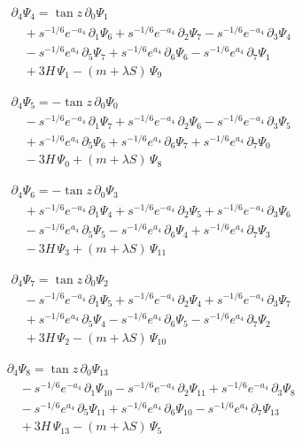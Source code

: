 \documentclass[11pt]{article}
\begin{document}
\[
\begin{aligned}
&\partial_{4}\Psi_{4}=\tan z\,\partial_{0}\Psi_{1} \\
&\quad +s^{-1/6}e^{-a_4}\,\partial_{1}\Psi_{6}+s^{-1/6}e^{-a_4}\,\partial_{2}\Psi_{7}-s^{-1/6}e^{-a_4}\,\partial_{3}\Psi_{4} \\
&\quad -s^{-1/6}e^{a_4}\,\partial_{5}\Psi_{7}+s^{-1/6}e^{a_4}\,\partial_{6}\Psi_{6}-s^{-1/6}e^{a_4}\,\partial_{7}\Psi_{1} \\
&\quad +3H\,\Psi_{1}-(m+\lambda S)\,\Psi_{9}
\end{aligned}\tag{V4}
\]

\[
\begin{aligned}
&\partial_{4}\Psi_{5}=-\tan z\,\partial_{0}\Psi_{0} \\
&\quad -s^{-1/6}e^{-a_4}\,\partial_{1}\Psi_{7}+s^{-1/6}e^{-a_4}\,\partial_{2}\Psi_{6}-s^{-1/6}e^{-a_4}\,\partial_{3}\Psi_{5} \\
&\quad +s^{-1/6}e^{a_4}\,\partial_{5}\Psi_{6}+s^{-1/6}e^{a_4}\,\partial_{6}\Psi_{7}+s^{-1/6}e^{a_4}\,\partial_{7}\Psi_{0} \\
&\quad -3H\,\Psi_{0}+(m+\lambda S)\,\Psi_{8}
\end{aligned}\tag{V5}
\]

\[
\begin{aligned}
&\partial_{4}\Psi_{6}=-\tan z\,\partial_{0}\Psi_{3} \\
&\quad +s^{-1/6}e^{-a_4}\,\partial_{1}\Psi_{4}+s^{-1/6}e^{-a_4}\,\partial_{2}\Psi_{5}+s^{-1/6}e^{-a_4}\,\partial_{3}\Psi_{6} \\
&\quad -s^{-1/6}e^{a_4}\,\partial_{5}\Psi_{5}-s^{-1/6}e^{a_4}\,\partial_{6}\Psi_{4}+s^{-1/6}e^{a_4}\,\partial_{7}\Psi_{3} \\
&\quad -3H\,\Psi_{3}+(m+\lambda S)\,\Psi_{11}
\end{aligned}\tag{V6}
\]

\[
\begin{aligned}
&\partial_{4}\Psi_{7}=\tan z\,\partial_{0}\Psi_{2} \\
&\quad -s^{-1/6}e^{-a_4}\,\partial_{1}\Psi_{5}+s^{-1/6}e^{-a_4}\,\partial_{2}\Psi_{4}+s^{-1/6}e^{-a_4}\,\partial_{3}\Psi_{7} \\
&\quad +s^{-1/6}e^{a_4}\,\partial_{5}\Psi_{4}-s^{-1/6}e^{a_4}\,\partial_{6}\Psi_{5}-s^{-1/6}e^{a_4}\,\partial_{7}\Psi_{2} \\
&\quad +3H\,\Psi_{2}-(m+\lambda S)\,\Psi_{10}
\end{aligned}\tag{V7}
\]

\[
\begin{aligned}
&\partial_{4}\Psi_{8}=\tan z\,\partial_{0}\Psi_{13} \\
&\quad -s^{-1/6}e^{-a_4}\,\partial_{1}\Psi_{10}-s^{-1/6}e^{-a_4}\,\partial_{2}\Psi_{11}+s^{-1/6}e^{-a_4}\,\partial_{3}\Psi_{8} \\
&\quad -s^{-1/6}e^{a_4}\,\partial_{5}\Psi_{11}+s^{-1/6}e^{a_4}\,\partial_{6}\Psi_{10}-s^{-1/6}e^{a_4}\,\partial_{7}\Psi_{13} \\
&\quad +3H\,\Psi_{13}-(m+\lambda S)\,\Psi_{5}
\end{aligned}\tag{V8}
\]
\end{document}
